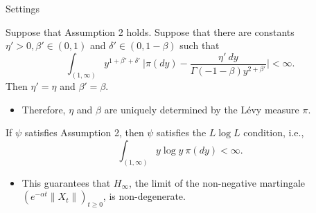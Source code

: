 \documentclass[9pt]{beamer}
\begin{document}
\begin{frame}[allowframebreaks]{Settings}
\begin{lemma}
	Suppose that Assumption  2 holds.
	Suppose that there are constants $\eta'>0, \beta'\in (0,1)$ and $\delta' \in (0, 1-\beta)$ such that
\[
	 \int_{(1,\infty)}y^{1+\beta' +\delta'}~\Big|\pi(dy)-\frac{\eta'~dy}{\Gamma(-1-\beta)y^{2+\beta'}}\Big| <\infty.
\]
	Then $\eta'= \eta$ and $\beta ' = \beta$.
\end{lemma}
\begin{itemize}
\item
	Therefore, $\eta$ and $\beta$ are uniquely determined by the L\'evy measure $\pi$.
\end{itemize}
\begin{lemma}
	If $\psi$ satisfies Assumption  2, then $\psi$ satisfies the $L \log L$ condition, i.e.,
\[
    \int_{(1,\infty)} y \log y~\pi(dy)< \infty.
\]
\end{lemma}
\begin{itemize}
\item
	This guarantees that $H_\infty$, the limit of the non-negative martingale $(e^{-\alpha t} \|X_t\|)_{t\geq 0}$, is non-degenerate.
\end{itemize}
\end{frame}
\end{document}
